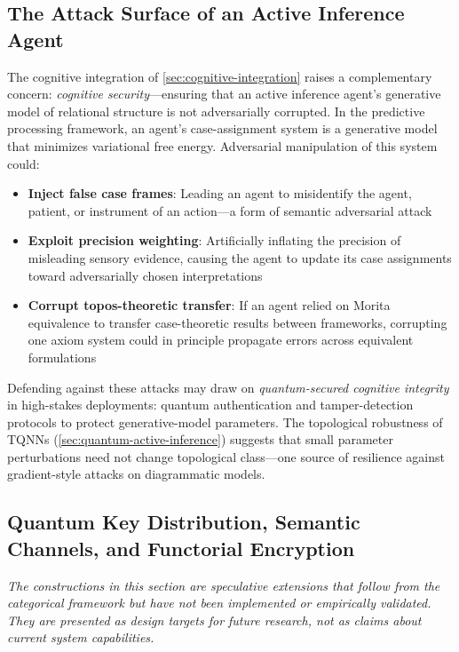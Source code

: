 \documentclass[
]{article}
\providecommand{\tightlist}{%
  \setlength{\itemsep}{0pt}\setlength{\parskip}{0pt}}
\begin{document}
\subsection{The Attack Surface of an Active Inference
Agent}\label{the-attack-surface-of-an-active-inference-agent}

The cognitive integration of \autoref{sec:cognitive-integration} raises
a complementary concern: \emph{cognitive security}---ensuring that an
active inference agent's generative model of relational structure is not
adversarially corrupted. In the predictive processing framework, an
agent's case-assignment system is a generative model that minimizes
variational free energy. Adversarial manipulation of this system could:

\begin{itemize}
\tightlist
\item
  \textbf{Inject false case frames}: Leading an agent to misidentify the
  agent, patient, or instrument of an action---a form of semantic
  adversarial attack
\item
  \textbf{Exploit precision weighting}: Artificially inflating the
  precision of misleading sensory evidence, causing the agent to update
  its case assignments toward adversarially chosen interpretations
\item
  \textbf{Corrupt topos-theoretic transfer}: If an agent relied on
  Morita equivalence to transfer case-theoretic results between
  frameworks, corrupting one axiom system could in principle propagate
  errors across equivalent formulations
\end{itemize}

Defending against these attacks may draw on \emph{quantum-secured
cognitive integrity} in high-stakes deployments: quantum authentication
and tamper-detection protocols to protect generative-model parameters.
The topological robustness of TQNNs
(\autoref{sec:quantum-active-inference}) suggests that small parameter
perturbations need not change topological class---one source of
resilience against gradient-style attacks on diagrammatic models.

\subsection{Quantum Key Distribution, Semantic Channels, and Functorial
Encryption}\label{quantum-key-distribution-semantic-channels-and-functorial-encryption}

\emph{The constructions in this section are speculative extensions that
follow from the categorical framework but have not been implemented or
empirically validated. They are presented as design targets for future
research, not as claims about current system capabilities.}
\end{document}
